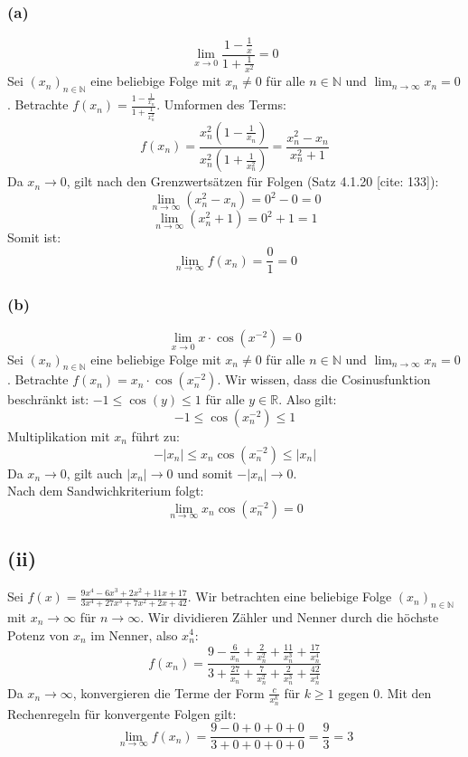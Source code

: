 \documentclass{article}
\begin{document}
\subsubsection*{(a)}
\[ \lim_{x\to 0} \frac{1 - \frac{1}{x}}{1 + \frac{1}{x^2}} = 0 \]
Sei \((x_n)_{n\in\mathbb{N}}\) eine beliebige Folge mit \(x_n \neq 0\) für alle \(n \in \mathbb{N}\) und \(\lim_{n\to\infty} x_n = 0\).
Betrachte \(f(x_n) = \frac{1 - \frac{1}{x_n}}{1 + \frac{1}{x_n^2}}\).
Umformen des Terms:
\[ f(x_n) = \frac{x_n^2(1 - \frac{1}{x_n})}{x_n^2(1 + \frac{1}{x_n^2})} = \frac{x_n^2 - x_n}{x_n^2 + 1} \]
Da \(x_n \to 0\), gilt nach den Grenzwertsätzen für Folgen (Satz 4.1.20 [cite: 133]):
\[ \lim_{n\to\infty} (x_n^2 - x_n) = 0^2 - 0 = 0 \]
\[ \lim_{n\to\infty} (x_n^2 + 1) = 0^2 + 1 = 1 \]
Somit ist:
\[ \lim_{n\to\infty} f(x_n) = \frac{0}{1} = 0 \]

\subsubsection*{(b)}
\[ \lim_{x\to 0} x \cdot \cos(x^{-2}) = 0 \]
Sei \((x_n)_{n\in\mathbb{N}}\) eine beliebige Folge mit \(x_n \neq 0\) für alle \(n \in \mathbb{N}\) und \(\lim_{n\to\infty} x_n = 0\).
Betrachte \(f(x_n) = x_n \cdot \cos(x_n^{-2})\).
Wir wissen, dass die Cosinusfunktion beschränkt ist: \(-1 \le \cos(y) \le 1\) für alle \(y \in \mathbb{R}\).
Also gilt:
\[ -1 \le \cos(x_n^{-2}) \le 1 \]
Multiplikation mit \(x_n\) führt zu:
\[ -|x_n| \le x_n \cos(x_n^{-2}) \le |x_n| \]
Da \(x_n \to 0\), gilt auch \(|x_n| \to 0\) und somit \(-|x_n| \to 0\). \\
Nach dem Sandwichkriterium folgt:
\[ \lim_{n\to\infty} x_n \cos(x_n^{-2}) = 0 \]

\subsection*{(ii)}
Sei \(f(x) = \frac{9x^4 - 6x^3 + 2x^2 + 11x + 17}{3x^4 + 27x^3 + 7x^2 + 2x + 42}\).
Wir betrachten eine beliebige Folge \((x_n)_{n\in\mathbb{N}}\) mit \(x_n \to \infty\) für \(n \to \infty\).
Wir dividieren Zähler und Nenner durch die höchste Potenz von \(x_n\) im Nenner, also \(x_n^4\):
\[ f(x_n) = \frac{9 - \frac{6}{x_n} + \frac{2}{x_n^2} + \frac{11}{x_n^3} + \frac{17}{x_n^4}}{3 + \frac{27}{x_n} + \frac{7}{x_n^2} + \frac{2}{x_n^3} + \frac{42}{x_n^4}} \]
Da \(x_n \to \infty\), konvergieren die Terme der Form \(\frac{c}{x_n^k}\) für \(k \ge 1\) gegen \(0\).
Mit den Rechenregeln für konvergente Folgen gilt:
\[ \lim_{n\to\infty} f(x_n) = \frac{9 - 0 + 0 + 0 + 0}{3 + 0 + 0 + 0 + 0} = \frac{9}{3} = 3 \]
\end{document}
